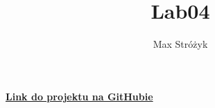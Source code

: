 \documentclass[a4paper, 11pt]{article}
\title{Lab04}
\author{Max Stróżyk}
\begin{document}
\maketitle
\tableofcontents
\begin{center}
    \href{https://github.com/maxi7524/numerical_methods_lab05}{\textbf{Link do projektu na GitHubie}}
\end{center}


\newpage


\newpage


\newpage


\pagestyle{fancy}
 
\nocite{*}



% 
\end{document}
